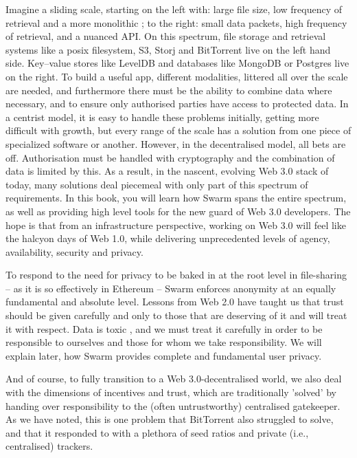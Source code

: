 Imagine a sliding scale, starting on the left with: large file size, low frequency of retrieval and a more monolithic ; to the right: small data packets, high frequency of retrieval, and a nuanced API. On this spectrum, file storage and retrieval systems like a posix filesystem, S3, Storj and BitTorrent live on the left hand side. Key--value stores like LevelDB and databases like MongoDB or Postgres live on the right. To build a useful app, different modalities, littered all over the scale are needed, and furthermore there must be the ability to combine data where necessary, and to ensure only authorised parties have access to protected data. In a centrist model, it is easy to handle these problems initially, getting more difficult with growth, but every range of the scale has a solution from one piece of specialized software or another. However, in the decentralised model, all bets are off. Authorisation must be handled with cryptography and the combination of data is limited by this. As a result, in the nascent, evolving Web 3.0 stack of today, many solutions deal piecemeal with only part of this spectrum of requirements. In this book, you will learn how Swarm spans the entire spectrum, as well as providing high level tools for the new guard of Web 3.0 developers. The hope is that from an infrastructure perspective, working on Web 3.0 will feel like the halcyon days of Web 1.0, while delivering unprecedented levels of agency, availability, security and privacy.

To respond to the need for privacy to be baked in at the root level in file-sharing – as it is so effectively in Ethereum – Swarm enforces anonymity at an equally fundamental and absolute level. Lessons from Web 2.0 have taught us that trust should be given carefully and only to those that are deserving of it and will treat it with respect. Data is toxic \cite{schneier2019Jul}, and we must treat it carefully in order to be responsible to ourselves and those for whom we take responsibility. We will explain later, how Swarm provides complete and fundamental user privacy.

And of course, to fully transition to a Web 3.0-decentralised world, we also deal with the dimensions of incentives and trust, which are traditionally 'solved' by handing over responsibility to the (often untrustworthy) centralised gatekeeper. As we have noted, this is one problem that BitTorrent also struggled to solve, and that it responded to with a plethora of seed ratios and private (i.e., centralised) trackers.

